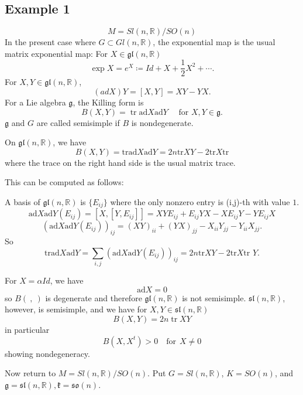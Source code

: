 \subsection{Example 1}
	\[
	M=Sl(n,\mathbb{R})/SO(n)
	\]
	In the present case where $G \subset G l(n, \mathbb{R})$, the
	exponential map is the usual matrix exponential map:
	For $X \in \mathfrak{gl}(n, \mathbb{R})$
	\[
	\exp X=e^{X}\coloneq {Id}+X+\frac{1}{2} X^{2}+\cdots.
	\]
	For $X, Y \in \mathfrak{gl}(n, \mathbb{R})$, 
	\[
	({ad} X) Y=[X, Y]=X Y-Y X.
	\]
	For a Lie algebra $\mathfrak{g}$, the Killing form is
	\[
	B(X, Y)=\operatorname{tr} \mathrm{ad} X \mathrm{ad} Y \quad
	\text { for } X, Y \in \mathfrak{g}.
	\]
	$\mathfrak{g}$ and $G$ are called semisimple if $B$ is
	nondegenerate.

	On $\mathfrak{gl}(n, \mathbb{R})$, we have 
	\[
	B(X,Y)=\text{tr}
	\mathrm{ad}X\mathrm{ad}Y=2n\text{tr}XY-2\text{tr}X\text{tr}
	\]
	where the trace on the right hand side is the usual matrix
	trace. 	

	This can be computed as follows: 
	
	 A basis of $\mathfrak{gl}(n,\mathbb{R})$ is $\{E_{ij}\}$
	 where the only nonzero entry is (i,j)-th with value $1$.
	\[\mathrm{ad}X
	\mathrm{ad}Y(E_{ij})=[X,[Y,E_{ij}]]=XYE_{ij}+E_{ij}YX-XE_{ij
	}Y-YE_{ij}X\]
	\[(\mathrm{ad}X
	\mathrm{ad}Y(E_{ij}))_{ij}=(XY)_{ii}+(YX)_{jj}-X_{ii}Y_{jj}-
	Y_{ii}X_{jj}.\]
	So
	\[\text{tr}\mathrm{ad}X\mathrm{ad}Y=\sum_{i,j}(\mathrm{ad}X
	\mathrm{ad}Y(E_{ij}))_{ij}=2n\text{tr}XY-2\text{tr}X\text{tr
	}Y.\]

	For $X=\alpha {Id}$, we have
	\[
	\mathrm{ad} X=0
	\]
	so $B(\ ,\ )$ is degenerate and therefore $\mathfrak{g l}(n,
	\mathbb{R})$ is not semisimple. $\mathfrak{sl}(n,
	\mathbb{R})$, however, is semisimple, and we have for $X, Y
	\in \mathfrak{sl}(n, \mathbb{R})$
	\[
	B(X, Y)=2 n \operatorname{tr} X Y
	\]
	in particular 
	\[
	B\left(X, X^{t}\right)>0 \quad \text{for}\ \  X \neq 0
	\]
	showing nondegeneracy.	

	
	Now return to $M=S l(n, \mathbb{R}) / S O(n)$.  Put $G=S l(n,
	\mathbb{R})$,
	$K=S O(n)$, and $\mathfrak{g}=\mathfrak{sl}(n, \mathbb{R}),
	\mathfrak{k}=\mathfrak{s o}(n)$. 
	
